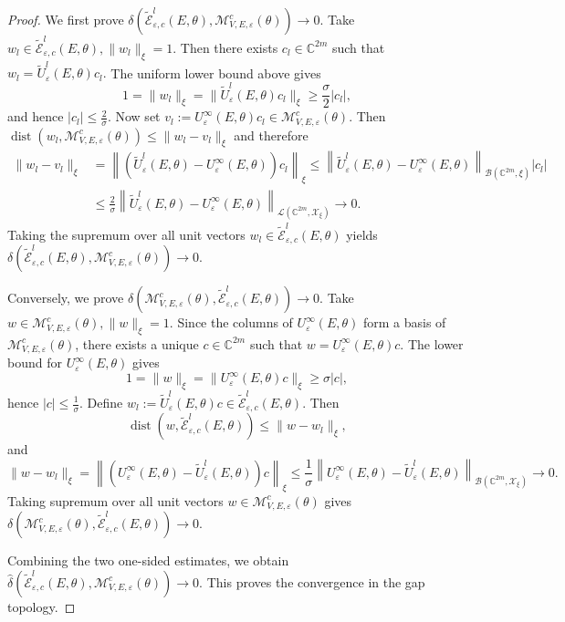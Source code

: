 \documentclass[reqno,11pt]{amsart}
\begin{document}
\begin{proof}
We first prove
$
\delta\left(\widetilde{\mathcal E}_{\varepsilon,c}^l(E,\theta),\mathcal M_{V,E,\varepsilon}^{c}(\theta)\right)\to 0 .
$
Take
$
w_l\in \widetilde{\mathcal E}_{\varepsilon,c}^l(E,\theta),
\|w_l\|_{\xi}=1 .
$
Then there exists $c_l\in\mathbb C^{2m}$ such that
$
w_l=\widetilde U_{\varepsilon}^{l}(E,\theta)c_l .
$
The uniform lower bound above gives
$$
1=\|w_l\|_{\xi}
=\|\widetilde U_{\varepsilon}^{l}(E,\theta)c_l\|_{\xi}
\ge \frac{\sigma}{2}|c_l|,
$$
and hence
$|c_l|\le \frac{2}{\sigma}.$
Now set
$
v_l:=U_{\varepsilon}^{\infty}(E,\theta)c_l
\in\mathcal M_{V,E,\varepsilon}^{c}(\theta).
$
Then
$
\operatorname{dist}\left(w_l,\mathcal M_{V,E,\varepsilon}^{c}(\theta)
\right)\le\|w_l-v_l\|_{\xi}
$
and therefore
$$
\begin{aligned}
\|w_l-v_l\|_{\xi}&=\left\|
\left(\widetilde U_{\varepsilon}^{l}(E,\theta)-U_{\varepsilon}^{\infty}(E,\theta)
\right)c_l\right\|_{\xi}\le\left\|\widetilde U_{\varepsilon}^{l}(E,\theta)
-U_{\varepsilon}^{\infty}(E,\theta)
\right\|_{\mathcal B(\mathbb C^{2m},\xi)}
|c_l|  \\
&\le
\frac{2}{\sigma}\left\|
\widetilde U_{\varepsilon}^{l}(E,\theta)-U_{\varepsilon}^{\infty}(E,\theta)
\right\|_{\mathcal L(\mathbb C^{2m},\mathcal X_\xi)}
\rightarrow 0 .
\end{aligned}
$$
Taking the supremum over all unit vectors
$w_l\in\widetilde{\mathcal E}_{\varepsilon,c}^l(E,\theta)$ yields
$
\delta\left(\widetilde{\mathcal E}_{\varepsilon,c}^l(E,\theta),\mathcal M_{V,E,\varepsilon}^{c}(\theta)\right)\to 0 .
$

Conversely, we prove
$
\delta\left(\mathcal M_{V,E,\varepsilon}^{c}(\theta),\widetilde{\mathcal E}_{\varepsilon,c}^l(E,\theta)\right)\to 0 .
$
Take
$
w\in\mathcal M_{V,E,\varepsilon}^{c}(\theta),
\|w\|_{\xi}=1 .
$
Since the columns of $U_{\varepsilon}^{\infty}(E,\theta)$ form a basis of
$\mathcal M_{V,E,\varepsilon}^{c}(\theta)$, there exists a unique
$c\in\mathbb C^{2m}$ such that
$
w=U_{\varepsilon}^{\infty}(E,\theta)c .
$
The lower bound for $U_{\varepsilon}^{\infty}(E,\theta)$ gives
$$
1=\|w\|_{\xi}
=\|U_{\varepsilon}^{\infty}(E,\theta)c\|_{\xi}\ge \sigma |c|,
$$
hence
$
|c|\le \frac{1}{\sigma}.
$
Define
$
w_l:=\widetilde U_{\varepsilon}^{l}(E,\theta)c\in\widetilde{\mathcal E}_{\varepsilon,c}^l(E,\theta).
$
Then
$$
\operatorname{dist}\left(w,\widetilde{\mathcal E}_{\varepsilon,c}^l(E,\theta)\right)\le\|w-w_l\|_{\xi},
$$
and
$$
\|w-w_l\|_{\xi}=\left\|\left(U_{\varepsilon}^{\infty}(E,\theta)-
\widetilde U_{\varepsilon}^{l}(E,\theta)\right)c\right\|_{\xi}\le\frac{1}{\sigma}
\left\|U_{\varepsilon}^{\infty}(E,\theta)-
\widetilde U_{\varepsilon}^{l}(E,\theta)\right\|_{\mathcal B(\mathbb C^{2m},\mathcal X_\xi)}
\rightarrow 0 .
$$
Taking  supremum over all unit vectors
$w\in\mathcal M_{V,E,\varepsilon}^{c}(\theta)$ gives
$
\delta\left(\mathcal M_{V,E,\varepsilon}^{c}(\theta),\widetilde{\mathcal E}_{\varepsilon,c}^l(E,\theta)\right)\to 0 .
$

Combining the two one-sided estimates, we obtain
$
\widehat\delta\left(\widetilde{\mathcal E}_{\varepsilon,c}^l(E,\theta),
\mathcal M_{V,E,\varepsilon}^{c}(\theta)\right)\to 0 .
$
This proves the convergence in the gap topology.
\end{proof}
\end{document}
